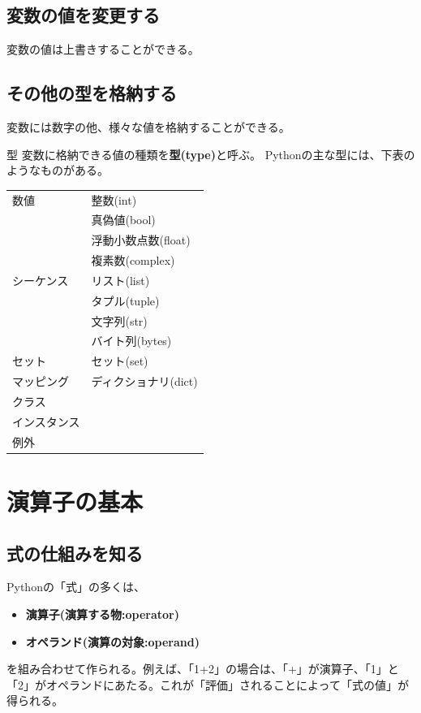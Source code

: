 \documentclass[11pt,a4paper]{jreport}
\begin{document}
\subsection{変数の値を変更する}
変数の値は上書きすることができる。

\subsection{その他の型を格納する}
変数には数字の他、様々な値を格納することができる。

\begin{itembox}[htbp]{型}
 変数に格納できる値の種類を{\bf 型(type)}と呼ぶ。
 Pythonの主な型には、下表のようなものがある。

\end{itembox}


\begin{table}[htbp]
 \begin{center}
  \begin{tabular}{|ll|} \hline
   数値         & 整数(int)            \\
                & 真偽値(bool)         \\
                & 浮動小数点数(float)  \\
                & 複素数(complex)      \\ \hline
   シーケンス   & リスト(list)         \\
                & タプル(tuple)        \\
                & 文字列(str)          \\
                & バイト列(bytes)      \\ \hline
   セット       & セット(set)          \\ \hline
   マッピング   & ディクショナリ(dict) \\ \hline
   クラス       &                      \\ \hline
   インスタンス &                      \\ \hline
   例外         &                      \\ \hline
  \end{tabular}
 \end{center}
\end{table}

\section{演算子の基本}
\subsection{式の仕組みを知る}
Pythonの「式」の多くは、
\begin{itemize}
 \item {\bf 演算子(演算する物:operator)}
 \item {\bf オペランド(演算の対象:operand)}
\end{itemize}
を組み合わせて作られる。例えば、「1+2」の場合は、「+」が演算子、「1」と「2」がオペランドにあたる。これが「評価」されることによって「式の値」が得られる。
\end{document}
